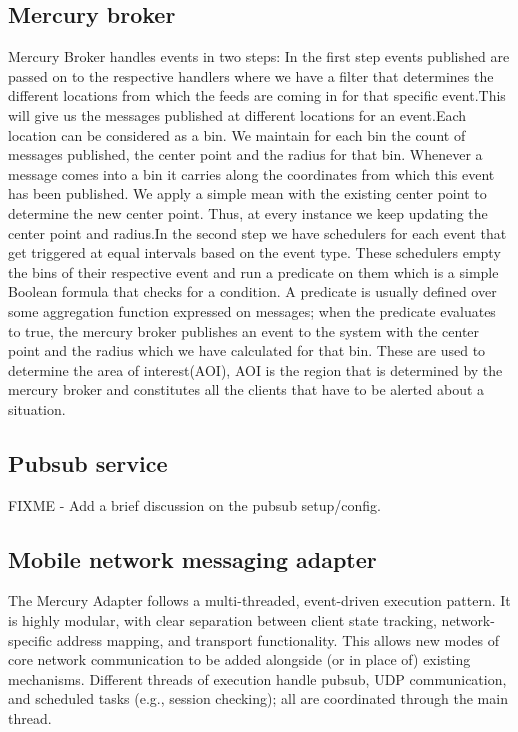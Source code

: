 \subsection{Mercury broker}
  
Mercury Broker handles events in two steps: In the first step events
published are passed on to the respective handlers where we have a
filter that determines the different locations from which the feeds
are coming in for that specific event.This will give us the messages
published at different locations for an event.Each location can be
considered as a bin. We maintain for each bin the count of messages
published, the center point and the radius for that bin.  Whenever a
message comes into a bin it carries along the coordinates from which
this event has been published. We apply a simple mean with the
existing center point to determine the new center point. Thus, at
every instance we keep updating the center point and radius.In the
second step we have schedulers for each event that get triggered at
equal intervals based on the event type.  These schedulers empty the
bins of their respective event and run a predicate on them which is a
simple Boolean formula that checks for a condition.  A predicate is
usually defined over some aggregation function expressed on messages;
when the predicate evaluates to true, the mercury broker publishes an
event to the system with the center point and the radius which we have
calculated for that bin. These are used to determine the area of
interest(AOI), AOI is the region that is determined by the mercury
broker and constitutes all the clients that have to be alerted about a
situation.

\subsection{Pubsub service}

  FIXME - Add a brief discussion on the pubsub setup/config.

\subsection{Mobile network messaging adapter}

The Mercury Adapter follows a multi-threaded, event-driven execution
pattern. It is highly modular, with clear separation between client
state tracking, network-specific address mapping, and transport
functionality.  This allows new modes of core network communication to
be added alongside (or in place of) existing mechanisms.  Different
threads of execution handle pubsub, UDP communication, and scheduled
tasks (e.g., session checking); all are coordinated through the main
thread.

